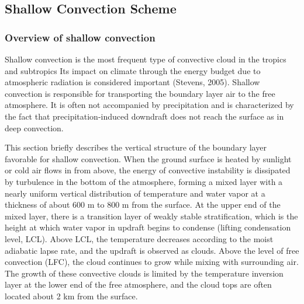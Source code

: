 \subsection{Shallow Convection Scheme}\label{shallow-convection-scheme}

\subsubsection{Overview of shallow convection}\label{overview-of-shallow-convection}
Shallow convection is the most frequent type of convective cloud in the tropics and subtropics Its impact on climate through the energy budget due to atmospheric radiation is considered important (Stevens, 2005).
Shallow convection is responsible for transporting the boundary layer air to the free atmosphere. It is often not accompanied by precipitation and is characterized by the fact that precipitation-induced downdraft does not reach the surface as in deep convection.

This section briefly describes the vertical structure of the boundary layer favorable for shallow convection.
When the ground surface is heated by sunlight or cold air flows in from above, the energy of convective instability is dissipated by turbulence in the bottom of the atmosphere, forming a mixed layer with a nearly uniform vertical distribution of 
temperature and water vapor at a thickness of about 600 m to 800 m from the surface.
At the upper end of the mixed layer, there is a transition layer of weakly stable stratification, which is the height at which water vapor in updraft begins to condense (lifting condensation level, LCL).
Above LCL, the temperature decreases according to the moist adiabatic lapse rate, and the updraft is observed as clouds. Above the level of free convection (LFC), the cloud continues to grow while mixing with surrounding air. 
The growth of these convective clouds is limited by the temperature inversion layer at the lower end of the free atmosphere, and the cloud tops are often located about 2 km from the surface.


